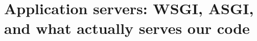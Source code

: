 \chapter{Application servers: WSGI, ASGI, and what actually serves our code}
\label{ch:application-servers-wsgi-asgi-and-what}

